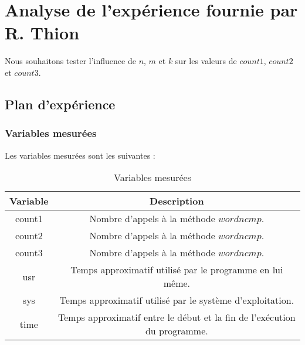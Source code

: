 
\section{Analyse de l'expérience fournie par R. Thion}

Nous souhaitons tester l'influence de $n$, $m$ et $k$ sur les valeurs de $count1$, $count2$ et $count3$.

\subsection{Plan d'expérience}

\subsubsection{Variables mesurées}

Les variables mesurées sont les suivantes :

\begin{table}[H]
	\centering
	\caption{Variables mesurées}
	\label{tab:variablesMesureesFournie}
	\begin{tabular}{c|c}
		\toprule
		Variable & Description\\
		\midrule
		count1 & Nombre d'appels à la méthode $wordncmp$.\\
		count2 & Nombre d'appels à la méthode $wordncmp$.\\
		count3 & Nombre d'appels à la méthode $wordncmp$.\\
		usr & Temps approximatif utilisé par le programme en lui même.\\
		sys & Temps approximatif utilisé par le système d'exploitation.\\
		time & Temps approximatif entre le début et la fin de l'exécution du programme.\\
		\bottomrule
	\end{tabular}
\end{table}

